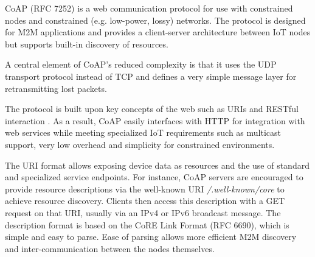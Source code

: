 CoAP \cite{bormann2012coap} (RFC 7252) is a web communication protocol for use with constrained nodes and constrained (e.g. low-power, lossy) networks. The protocol is designed for M2M applications and provides a client-server architecture between IoT nodes but supports built-in discovery of resources.

A central element of CoAP's reduced complexity is that it uses the UDP transport protocol instead of TCP and defines a very simple message layer for retransmitting lost packets.


The protocol is built upon key concepts of the web such as URIs and RESTful interaction \cite{pereira2013enabling}. As a result, CoAP easily interfaces with HTTP for integration with web services while meeting specialized IoT requirements such as multicast support, very low overhead and simplicity for constrained environments. 

The URI format allows exposing device data as resources and the use of standard and specialized service endpoints. For instance, CoAP servers are encouraged to provide resource descriptions via the well-known URI \emph{/.well-known/core} to achieve resource discovery. Clients then access this description with a GET request on that URI, usually via an IPv4 or IPv6 broadcast message. The description format is based on the CoRE Link Format (RFC 6690), which is simple and easy to parse. Ease of parsing allows more efficient M2M discovery and inter-communication between the nodes themselves.


